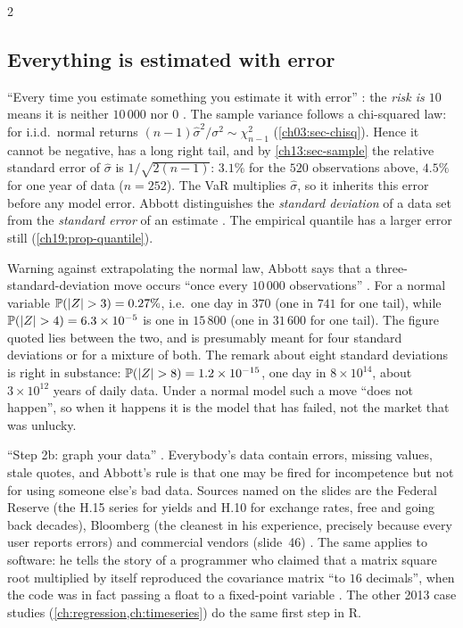 \begin{paracol}{2}
\subsection{Everything is estimated with error}
``Every time you estimate something you estimate it with error'' : the \emph{risk is $10$} means it is neither $10\,000$ nor $0$ . The sample variance follows a chi-squared law: for i.i.d.\ normal returns $(n-1)\hat\sigma^2/\sigma^2\sim\chi^2_{n-1}$  (\cref{ch03:sec-chisq}). Hence it cannot be negative, has a long right tail, and by \cref{ch13:sec-sample} the relative standard error of $\hat\sigma$ is $1/\sqrt{2(n-1)}$: $3.1\%$ for the $520$ observations above, $4.5\%$ for one year of data ($n=252$). The VaR multiplies $\hat\sigma$, so it inherits this error before any model error. Abbott distinguishes the \emph{standard deviation} of a data set from the \emph{standard error} of an estimate . The empirical quantile has a larger error still (\cref{ch19:prop-quantile}).

\begin{coursenote}\label{ch19:cn-sigma}
Warning against extrapolating the normal law, Abbott says that a three-standard-deviation move occurs ``once every $10\,000$ observations'' . For a normal variable $\Prob(|Z|>3)=0.27\%$, i.e.\ one day in $370$ (one in $741$ for one tail), while $\Prob(|Z|>4)=6.3\times10^{-5}$ is one in $15\,800$ (one in $31\,600$ for one tail). The figure quoted lies between the two, and is presumably meant for four standard deviations or for a mixture of both. The remark about eight standard deviations is right in substance: $\Prob(|Z|>8)=1.2\times10^{-15}$, one day in $8\times10^{14}$, about $3\times10^{12}$ years of daily data. Under a normal model such a move ``does not happen'', so when it happens it is the model that has failed, not the market that was unlucky.
\end{coursenote}

\begin{finance}\label{ch19:fin-data}
``Step 2b: graph your data'' . Everybody's data contain errors, missing values, stale quotes, and Abbott's rule is that one may be fired for incompetence but not for using someone else's bad data. Sources named on the slides are the Federal Reserve (the H.15 series for yields and H.10 for exchange rates, free and going back decades), Bloomberg (the cleanest in his experience, precisely because every user reports errors) and commercial vendors (slide~46) . The same applies to software: he tells the story of a programmer who claimed that a matrix square root multiplied by itself reproduced the covariance matrix ``to $16$ decimals'', when the code was in fact passing a float to a fixed-point variable . The other 2013 case studies (\cref{ch:regression,ch:timeseries}) do the same first step in R.
\end{finance}


\end{paracol}
